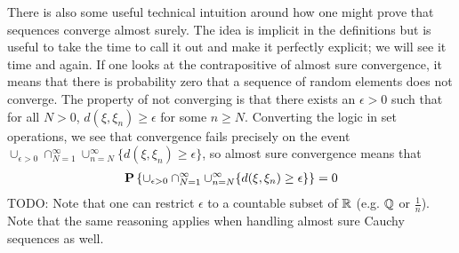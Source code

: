 There is also some useful technical intuition around how one might
prove that sequences converge almost surely.  The idea is implicit in
the definitions but is useful to take the time to call it out and make
it perfectly explicit; we will see it time and again.  If one looks at the contrapositive of almost
sure convergence, it means that there is probability zero that a
sequence of random elements does not converge.  The property of not
converging is that there exists an $\epsilon >0$ such that for all $N
> 0$, $d(\xi, \xi_n) \geq \epsilon$ for some $n \geq N$. Converting the
logic in set operations, we see that convergence fails
precisely on the event $\cup_{\epsilon > 0} \cap_{N=1}^\infty
\cup_{n=N}^\infty \lbrace d(\xi, \xi_n) \geq \epsilon \rbrace$, so
almost sure convergence means that 
\begin{align*}
\textbf{P}\left \{\cup_{\epsilon > 0} \cap_{N=1}^\infty \cup_{n=N}^\infty \lbrace d(\xi, \xi_n) \geq \epsilon \rbrace \right \} = 0
\end{align*}  
TODO: Note that one can restrict $\epsilon$ to a
countable subset of $\mathbb{R}$ (e.g. $\mathbb{Q}$ or $\frac{1}{n}$).  Note that the same reasoning applies when handling
almost sure Cauchy sequences as well.

